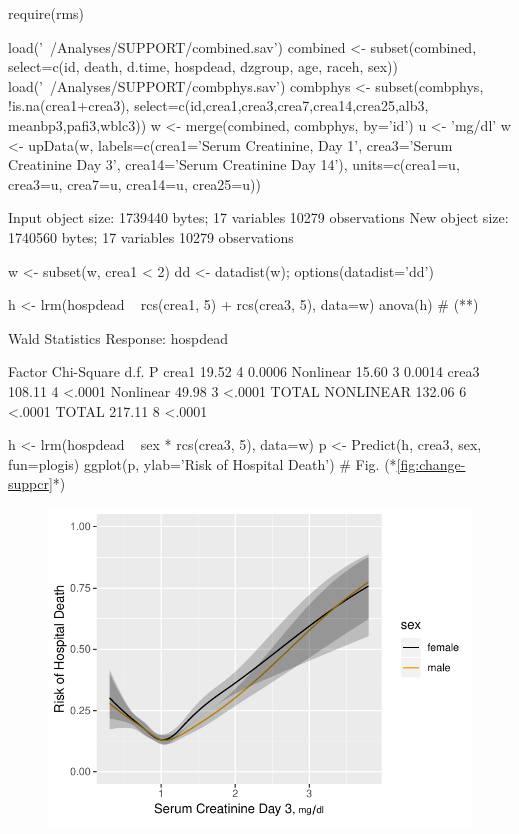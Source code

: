 \begin{Schunk}
\begin{Sinput}
require(rms)
\end{Sinput}
\begin{Sinput}
load('~/Analyses/SUPPORT/combined.sav')
combined <- subset(combined,
  select=c(id, death, d.time, hospdead, dzgroup, age, raceh, sex))
load('~/Analyses/SUPPORT/combphys.sav')
combphys <- subset(combphys, !is.na(crea1+crea3),
                   select=c(id,crea1,crea3,crea7,crea14,crea25,alb3,
                     meanbp3,pafi3,wblc3))
w <- merge(combined, combphys, by='id')
u <- 'mg/dl'
w <- upData(w, labels=c(crea1='Serum Creatinine, Day 1',
                 crea3='Serum Creatinine Day 3',
                 crea14='Serum Creatinine Day 14'),
            units=c(crea1=u, crea3=u, crea7=u, crea14=u, crea25=u))
\end{Sinput}
\begin{Soutput}
Input object size:	 1739440 bytes;	 17 variables	 10279 observations
New object size:	1740560 bytes;	17 variables	10279 observations
\end{Soutput}
\begin{Sinput}
w <- subset(w, crea1 < 2)
dd <- datadist(w); options(datadist='dd')

h <- lrm(hospdead ~ rcs(crea1, 5) + rcs(crea3, 5), data=w)
anova(h)   # (**)
\end{Sinput}
\begin{Soutput}
                Wald Statistics          Response: hospdead 

 Factor          Chi-Square d.f. P     
 crea1            19.52     4    0.0006
  Nonlinear       15.60     3    0.0014
 crea3           108.11     4    <.0001
  Nonlinear       49.98     3    <.0001
 TOTAL NONLINEAR 132.06     6    <.0001
 TOTAL           217.11     8    <.0001
\end{Soutput}
\begin{Sinput}
h <- lrm(hospdead ~ sex * rcs(crea3, 5), data=w)
p <- Predict(h, crea3, sex, fun=plogis)
ggplot(p, ylab='Risk of Hospital Death')    # Fig. (*\ref{fig:change-suppcr}*)
\end{Sinput}
\begin{figure}[htbp]

\centerline{\includegraphics[width=\maxwidth]{change-suppcr-1} }


\end{figure}
\end{Schunk}
